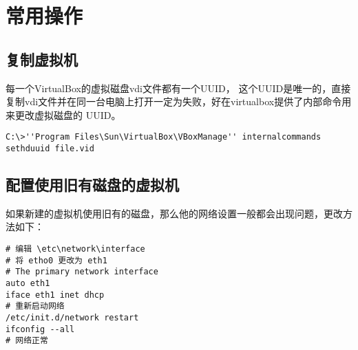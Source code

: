 \documentclass[12pt,a4paper]{article}
\begin{document}
\author{yanglei}
\tableofcontents


\section{常用操作}
\subsection{复制虚拟机}
每一个VirtualBox的虚拟磁盘vdi文件都有一个UUID， 这个UUID是唯一的，直接复制vdi文件并在同一台电脑上打开一定为失败，好在virtualbox提供了内部命令用来更改虚拟磁盘的 UUID。
\begin{lstlisting}
C:\>''Program Files\Sun\VirtualBox\VBoxManage'' internalcommands sethduuid file.vid
\end{lstlisting}

\subsection{配置使用旧有磁盘的虚拟机}
如果新建的虚拟机使用旧有的磁盘，那么他的网络设置一般都会出现问题，更改方法如下：
\begin{lstlisting}
# 编辑 \etc\network\interface
# 将 etho0 更改为 eth1
# The primary network interface
auto eth1
iface eth1 inet dhcp
# 重新启动网络
/etc/init.d/network restart
ifconfig --all
# 网络正常
\end{lstlisting}
\end{document}
